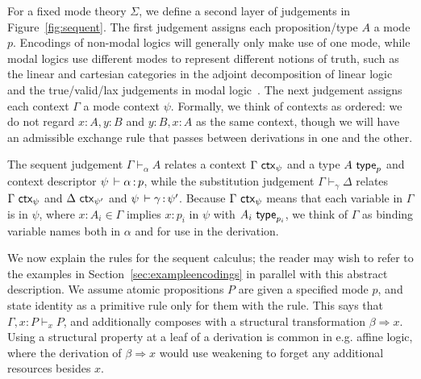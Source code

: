 \documentclass[a4paper,USenglish,numberwithinsect]{lipics-v2016}
\newcommand\spr{\ensuremath{\Rightarrow}} %
\newcommand\seq[3]{\ensuremath{#1 \vdash_{#2} #3}}
\newcommand\wftype[2]{\ensuremath{#1 \,\, \dsd{type}_{#2}}}
\renewcommand\wfctx[2]{\ensuremath{#1 \,\, \dsd{ctx}_{#2}}}
\renewcommand{\oftp}[3]{\ensuremath{#1 \, \vdash #2 \, \dcd{:} \, #3}}
\begin{document}
For a fixed mode theory $\Sigma$, we define a second layer of judgements
in Figure~\ref{fig:sequent}.  The first judgement assigns each
proposition/type $A$ a mode $p$.  Encodings of non-modal logics will
generally only make use of one mode, while modal logics use different
modes to represent different notions of truth, such as the linear and
cartesian categories in the adjoint decomposition of linear
logic~\cite{benton94mixed,bentonwadler96adjoint} and the true/valid/lax
judgements in modal logic~\cite{pfenningdavies}.  The next judgement
assigns each context $\Gamma$ a mode context $\psi$.  Formally, we think
of contexts as ordered: we do not regard $x:A,y:B$ and $y:B,x:A$ as the
same context, though we will have an admissible exchange rule that
passes between derivations in one and the other.

The sequent judgement \seq{\Gamma}{\alpha}{A} relates a context
$\wfctx{\Gamma}{\psi}$ and a type $\wftype{A}{p}$ and context descriptor
\oftp{\psi}{\alpha}{p}, while the substitution judgement \seq{\Gamma}{\gamma}{\Delta} relates
$\wfctx{\Gamma}{\psi}$ and $\wfctx{\Delta}{\psi'}$ and
$\oftp{\psi}{\gamma}{\psi'}$. Because $\wfctx{\Gamma}{\psi}$ means that
each variable in $\Gamma$ is in $\psi$, where $x : A_i \in \Gamma$
implies $x : p_i$ in $\psi$ with \wftype{A_i}{p_i}, we think of $\Gamma$
as binding variable names both in $\alpha$ and for use in the
derivation.

We now explain the rules for the sequent calculus; the reader may wish
to refer to the examples in Section~\ref{sec:exampleencodings} in
parallel with this abstract description.  We assume atomic propositions
$P$ are given a specified mode $p$, and state identity as a primitive
rule only for them with the  rule.  This says that
\seq{\Gamma,x:P}{x}{P}, and additionally composes with a structural
transformation $\beta \spr x$.  Using a structural property at a leaf of
a derivation is common in e.g. affine logic, where the derivation of
$\beta \spr x$ would use weakening to forget any additional resources
besides $x$.
\end{document}
